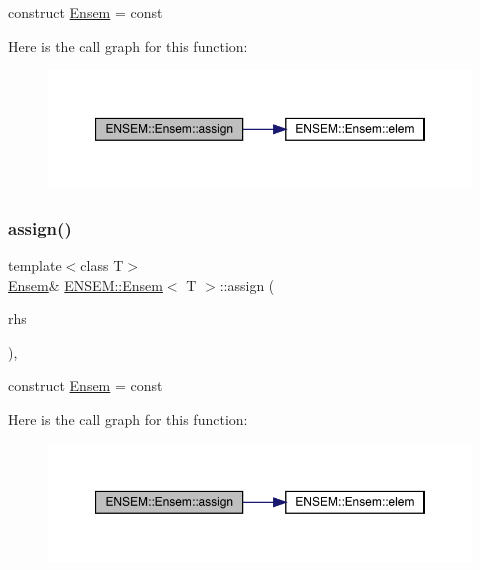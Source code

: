 construct \mbox{\hyperlink{classENSEM_1_1Ensem}{Ensem}} = const 

Here is the call graph for this function\+:
\nopagebreak
\begin{figure}[H]
\begin{center}
\leavevmode
\includegraphics[width=350pt]{d7/d3e/classENSEM_1_1Ensem_ae31c239c3dc966eaad70ec90489f5476_cgraph}
\end{center}
\end{figure}
\mbox{\label{classENSEM_1_1Ensem_ae31c239c3dc966eaad70ec90489f5476}} 
\subsubsection{\texorpdfstring{assign()}{assign()}\hspace{0.1cm}{\footnotesize\ttfamily [6/8]}}
{\footnotesize\ttfamily template$<$class T$>$ \\
\mbox{\hyperlink{classENSEM_1_1Ensem}{Ensem}}\& \mbox{\hyperlink{classENSEM_1_1Ensem}{E\+N\+S\+E\+M\+::\+Ensem}}$<$ T $>$\+::assign (\begin{DoxyParamCaption}\item[{const typename \mbox{\hyperlink{structENSEM_1_1WordType}{Word\+Type}}$<$ T $>$\+::Type\+\_\+t \&}]{rhs }\end{DoxyParamCaption})\hspace{0.3cm}{\ttfamily [inline]}, {\ttfamily [protected]}}



construct \mbox{\hyperlink{classENSEM_1_1Ensem}{Ensem}} = const 

Here is the call graph for this function\+:
\nopagebreak
\begin{figure}[H]
\begin{center}
\leavevmode
\includegraphics[width=350pt]{d7/d3e/classENSEM_1_1Ensem_ae31c239c3dc966eaad70ec90489f5476_cgraph}
\end{center}
\end{figure}
\mbox{\label{classENSEM_1_1Ensem_a140d8bb94d07a0abfb2ad396df63c625}} 

